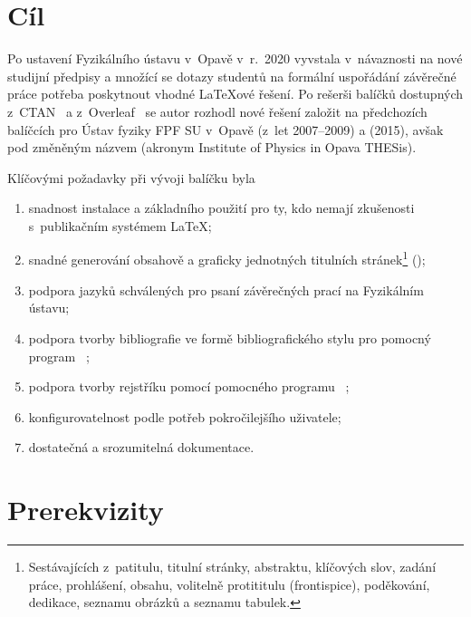 \section*{Cíl}\label{aim}

Po ustavení Fyzikálního ústavu v~Opavě v~r.~2020 vyvstala v~návaznosti na nové
studijní předpisy a množící se dotazy studentů na formální uspořádání
závěrečné práce potřeba poskytnout vhodné \LaTeX ové řešení.  Po rešerši
balíčků dostupných z~CTAN~\cite{CTAN:LIVE:CompTeXArNet:} a
z~Overleaf~\cite{Ovr:LIVE::Overleaf} se autor rozhodl nové řešení založit na
předchozích balíčcích pro Ústav fyziky FPF SU v~Opavě  (z~let
2007--2009) a  (2015), avšak pod změněným názvem \pkg{\ipotname}
(akronym Institute of Physics in Opava THESis).

Klíčovými požadavky při vývoji balíčku \pkg{\ipotname} byla
\begin{enumerate}
\item\label{easyuse} snadnost instalace a základního použití pro ty, kdo
  nemají zkušenosti s~publikačním systémem \LaTeX;
\item\label{autotitle} snadné generování obsahově a graficky jednotných
  titulních stránek\footnote{Sestávajících z~patitulu, titulní stránky,
    abstraktu, klíčových slov, zadání práce, prohlášení, obsahu, volitelně
    protititulu (frontispice), poděkování, dedikace, seznamu obrázků a seznamu
    tabulek.} ();
\item\label{langsup} podpora jazyků schválených pro psaní závěrečných prací na
  Fyzikálním ústavu;
\item\label{bibgen} podpora tvorby bibliografie ve formě bibliografického
  stylu pro pomocný program
  \BibTeX{}~\cite{Pat:LIVE:CTAN:BibTeX};
\item\label{indgen} podpora tvorby rejstříku pomocí pomocného programu
  \MakeIndex{}~\cite{Bee:LIVE:CTAN:MakeIndex,%
    LtX:LIVE:CTAN:makeidx};
\item\label{advposs} konfigurovatelnost podle potřeb pokročilejšího uživatele;
\item\label{sufdoc} dostatečná a srozumitelná dokumentace.
\end{enumerate}

\section*{Prerekvizity}\label{prereq}

